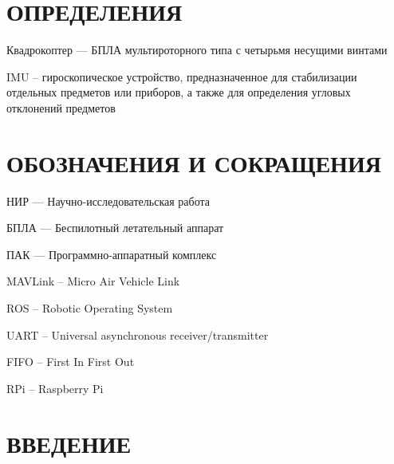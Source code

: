 \documentclass[a4paper,12pt]{article}
\begin{document}
\pagebreak
\thispagestyle{empty}

\section*{\centering ОПРЕДЕЛЕНИЯ}

\thispagestyle{empty} %

Квадрокоптер --- БПЛА мультироторного типа с четырьмя несущими винтами

IMU -- гироскопическое устройство, предназначенное для стабилизации отдельных предметов или приборов, а также для определения угловых отклонений предметов

\pagebreak
\thispagestyle{empty}

\section*{\centering ОБОЗНАЧЕНИЯ И СОКРАЩЕНИЯ}

НИР --- Научно-исследовательская работа

БПЛА --- Беспилотный летательный аппарат

ПАК --- Программно-аппаратный комплекс

MAVLink -- Micro Air Vehicle Link

ROS -- Robotic Operating System

UART -- Universal asynchronous receiver/transmitter

FIFO -- First In First Out

RPi -- Raspberry Pi

\pagebreak
\thispagestyle{empty}

\tableofcontents
\thispagestyle{empty}
\pagebreak

\section*{\centering ВВЕДЕНИЕ}
\setcounter{page}{3}
\pagebreak
\pagebreak
\pagebreak
\pagebreak
\pagebreak
\pagebreak
\end{document}

